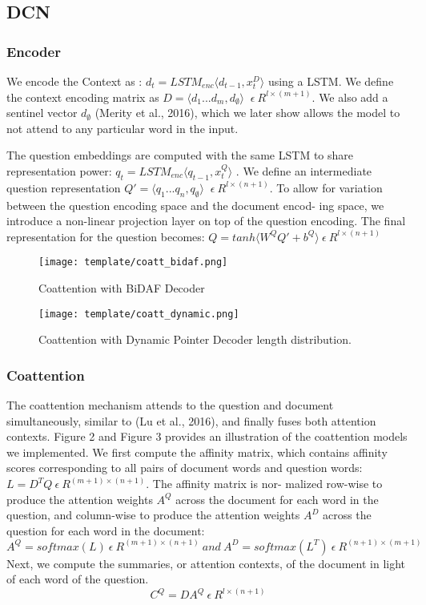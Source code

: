 \documentclass{article} %
\begin{document}
\subsection{DCN}

\subsubsection{Encoder}
We encode the Context as : $d_{t} = LSTM_{enc} \langle d_{t-1},x^{D}_{t} \rangle $ using a LSTM. 
We define the context encoding matrix as $ D = \langle d_{1} ...d_{m},d_{\emptyset} \rangle $ $ \ \epsilon \  R^{l\times(m+1)} $.
We also add a sentinel vector $ d_{\emptyset} $ (Merity et al., 2016), which we later show allows the model to not attend to any particular word in the input.

The question embeddings are computed with the same LSTM to share representation power: $ q_{t} =LSTM_{enc} \langle q_{t-1} , x^{Q}_{t} \rangle $ .
We define an intermediate question representation $ Q′ = \langle q_{1} . . . q_{n},q_{\emptyset} \rangle $ $ \ \epsilon \  R^{l\times(n+1)} $.
To allow for variation between the question encoding space and the document encod- ing space, we introduce a non-linear projection layer on top of the question encoding. 
The final representation for the question becomes: $ Q = tanh \langle   W^Q Q′ + b^Q \rangle \  \epsilon \  R^{l\times(n+1)} $

\begin{figure}
\texttt{[image: template/coatt\_bidaf.png]}
\centering
\caption{Coattention with BiDAF Decoder}
\end{figure}

\begin{figure}
\texttt{[image: template/coatt\_dynamic.png]}
\centering
\caption{Coattention with Dynamic Pointer Decoder length distribution.}
\end{figure}

\subsubsection{Coattention}

The coattention mechanism  attends to the question and document simultaneously, similar to (Lu et al., 2016), and finally fuses both attention contexts. Figure 2 and Figure 3 provides an illustration of the coattention models we implemented.
We first compute the affinity matrix, which contains affinity scores corresponding to all pairs of document words and question words: $ L = D^{T}Q \ \epsilon \  R^{(m+1)\times(n+1)} $. The affinity matrix is nor-
malized row-wise to produce the attention weights $A^{Q}$ across the document for each word in the question, and column-wise to produce the attention weights $A^{D}$ across the question for each word in the document:
$$A^{Q} = softmax (L) \  \epsilon \ R^{(m+1)\times(n+1)} \ and \  A^{D} = softmax(L^{T}) \ \epsilon \ R^{(n+1)\times(m+1)}  $$
Next, we compute the summaries, or attention contexts, of the document in light of each word of the question.
$$C^{Q} = DA^{Q} \  \epsilon \  R^{l\times(n+1)}$$
\end{document}
